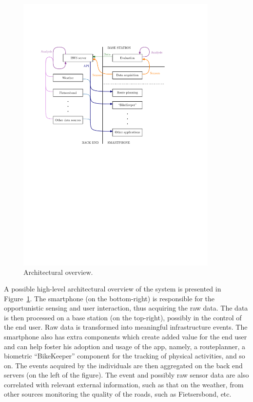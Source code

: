 \documentclass[preprint,12pt]{elsarticle}
\theoremstyle{definition}
\begin{document}
\begin{figure}[ht]
\begin{center}
\includegraphics[width=100mm]{figures/systemoverview}
\caption{Architectural overview.\label{fig:sys}}
\end{center}
\end{figure}

A possible high-level architectural overview of the system is
presented in Figure~\ref{fig:sys}. The smartphone (on the
bottom-right) is responsible for the opportunistic sensing and user
interaction, thus acquiring the raw data. The data is then processed
on a base station (on the top-right), possibly in the control of the
end user. Raw data is transformed into meaningful infrastructure
events. The smartphone also has extra components which create added
value for the end user and can help foster his adoption  and usage of
the app, namely, a routeplanner, a biometric ``BikeKeeper'' component
for the tracking of physical activities, and so on. The events
acquired by the individuals are then aggregated on the back end
servers (on the left of the figure). The event and possibly raw sensor
data are also correlated with relevant external information, such as
that on the weather, from other sources monitoring the quality of the
roads, such as Fietsersbond, etc.
\end{document}

